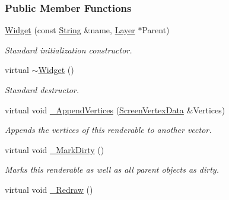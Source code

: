 \subsubsection*{Public Member Functions}
\begin{DoxyCompactItemize}
\item 
\hyperlink{classMezzanine_1_1UI_1_1Widget_ac30ecaf39b9a94ed9f00686e838f5e19}{Widget} (const \hyperlink{namespaceMezzanine_acf9fcc130e6ebf08e3d8491aebcf1c86}{String} \&name, \hyperlink{classMezzanine_1_1UI_1_1Layer}{Layer} $\ast$Parent)
\begin{DoxyCompactList}\small\item\em Standard initialization constructor. \item\end{DoxyCompactList}\item 
\hypertarget{classMezzanine_1_1UI_1_1Widget_ae5ef8e2cfe6330d11581f3f1b2a640a3}{
virtual \hyperlink{classMezzanine_1_1UI_1_1Widget_ae5ef8e2cfe6330d11581f3f1b2a640a3}{$\sim$Widget} ()}
\label{classMezzanine_1_1UI_1_1Widget_ae5ef8e2cfe6330d11581f3f1b2a640a3}

\begin{DoxyCompactList}\small\item\em Standard destructor. \item\end{DoxyCompactList}\item 
virtual void \hyperlink{classMezzanine_1_1UI_1_1Widget_a756bf060fd25e54a00cfa1f13d78df2e}{\_\-AppendVertices} (\hyperlink{classMezzanine_1_1UI_1_1ScreenVertexData}{ScreenVertexData} \&Vertices)
\begin{DoxyCompactList}\small\item\em Appends the vertices of this renderable to another vector. \item\end{DoxyCompactList}\item 
\hypertarget{classMezzanine_1_1UI_1_1Widget_a9c35d7c9e817484cf5daa6442948fd79}{
virtual void \hyperlink{classMezzanine_1_1UI_1_1Widget_a9c35d7c9e817484cf5daa6442948fd79}{\_\-MarkDirty} ()}
\label{classMezzanine_1_1UI_1_1Widget_a9c35d7c9e817484cf5daa6442948fd79}

\begin{DoxyCompactList}\small\item\em Marks this renderable as well as all parent objects as dirty. \item\end{DoxyCompactList}\item 
\hypertarget{classMezzanine_1_1UI_1_1Widget_a04b7ce5c3c57361d855cf60b548fa262}{
virtual void \hyperlink{classMezzanine_1_1UI_1_1Widget_a04b7ce5c3c57361d855cf60b548fa262}{\_\-Redraw} ()}
\label{classMezzanine_1_1UI_1_1Widget_a04b7ce5c3c57361d855cf60b548fa262}


\end{DoxyCompactItemize}
